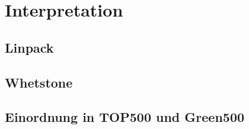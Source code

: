 \chapter{Interpretation}\label{Kapitel 4}


\section{Linpack}\label{Interpretation Linpack}

\section{Whetstone}\label{Interpretation Whetstone}

\section{Einordnung in TOP500 und Green500}\label{Rankings}




\endinput 




